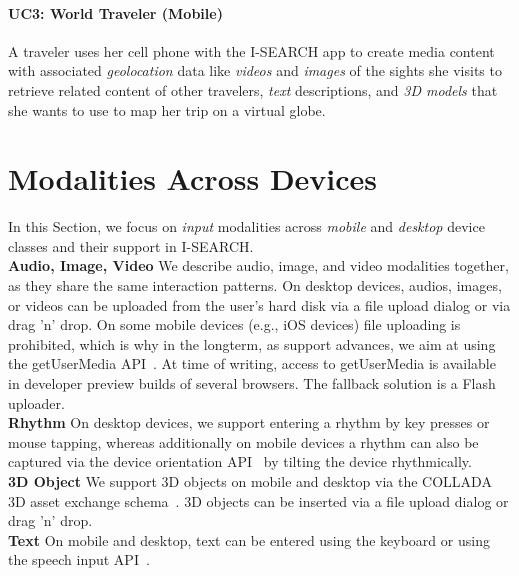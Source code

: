 \documentclass{sig-alternate}
\let\oldemph\emph
\renewcommand{\emph}[1]{\oldemph{\fontsize{9}{9}\selectfont #1}}
\begin{document}
\paragraph{UC3: World Traveler (Mobile)}
A traveler uses her cell phone with the \mbox{I-SEARCH} app to create media content with associated \emph{geolocation} data like \emph{videos} and \emph{images} of the sights she visits to retrieve related content of other travelers, \emph{text} descriptions, and \emph{3D models} that she wants to use to map her trip on a virtual globe.

\section{Modalities Across Devices}
In this Section, we focus on \emph{input} modalities across \emph{mobile} and \emph{desktop} device classes and their support in \mbox{I-SEARCH}.\\

\noindent \textbf{Audio, Image, Video}
We describe audio, image, and video modalities together, as they share the same interaction patterns.
On desktop devices, audios, images, or videos can be uploaded from the user's hard disk via a file upload dialog or via drag 'n' drop.
On some mobile devices (e.g., iOS devices) file uploading is prohibited, which is why in the longterm, as support advances, we aim at using the getUserMedia API~\cite{getusermedia}.
At time of writing, access to getUserMedia is available in developer
preview builds of several browsers.
The fallback solution is a Flash uploader.\\

\noindent \textbf{Rhythm}
On desktop devices, we support entering a rhythm by key presses or mouse tapping, whereas additionally on mobile devices a rhythm can also be captured via the device orientation API~\cite{deviceorientation} by tilting the device rhythmically.\\

\noindent \textbf{3D Object}
We support 3D objects on mobile and desktop via the COLLADA 3D asset exchange schema~\cite{collada}.
3D objects can be inserted via a file upload dialog or drag 'n' drop.\\ 

\noindent \textbf{Text}
On mobile and desktop, text can be entered using the keyboard or using the speech input API~\cite{speechinput}.\\
\end{document}
